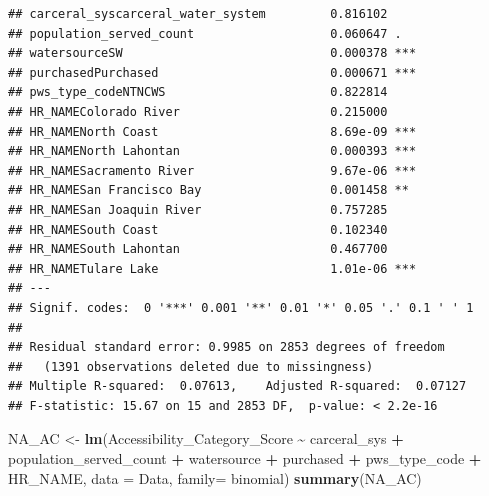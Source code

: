 \documentclass[
]{article}
\newenvironment{Shaded}{\begin{snugshade}}{\end{snugshade}}
\newcommand{\AttributeTok}[1]{\textcolor[rgb]{0.13,0.29,0.53}{#1}}
\newcommand{\FunctionTok}[1]{\textcolor[rgb]{0.13,0.29,0.53}{\textbf{#1}}}
\newcommand{\NormalTok}[1]{#1}
\newcommand{\OtherTok}[1]{\textcolor[rgb]{0.56,0.35,0.01}{#1}}
\newcommand{\SpecialCharTok}[1]{\textcolor[rgb]{0.81,0.36,0.00}{\textbf{#1}}}
\begin{document}
\begin{verbatim}
## carceral_syscarceral_water_system         0.816102    
## population_served_count                   0.060647 .  
## watersourceSW                             0.000378 ***
## purchasedPurchased                        0.000671 ***
## pws_type_codeNTNCWS                       0.822814    
## HR_NAMEColorado River                     0.215000    
## HR_NAMENorth Coast                        8.69e-09 ***
## HR_NAMENorth Lahontan                     0.000393 ***
## HR_NAMESacramento River                   9.67e-06 ***
## HR_NAMESan Francisco Bay                  0.001458 ** 
## HR_NAMESan Joaquin River                  0.757285    
## HR_NAMESouth Coast                        0.102340    
## HR_NAMESouth Lahontan                     0.467700    
## HR_NAMETulare Lake                        1.01e-06 ***
## ---
## Signif. codes:  0 '***' 0.001 '**' 0.01 '*' 0.05 '.' 0.1 ' ' 1
## 
## Residual standard error: 0.9985 on 2853 degrees of freedom
##   (1391 observations deleted due to missingness)
## Multiple R-squared:  0.07613,    Adjusted R-squared:  0.07127 
## F-statistic: 15.67 on 15 and 2853 DF,  p-value: < 2.2e-16
\end{verbatim}

\begin{Shaded}
\begin{Highlighting}[]
\NormalTok{NA\_AC }\OtherTok{\textless{}{-}} \FunctionTok{lm}\NormalTok{(Accessibility\_Category\_Score }\SpecialCharTok{\textasciitilde{}}\NormalTok{ carceral\_sys }\SpecialCharTok{+}\NormalTok{ population\_served\_count }\SpecialCharTok{+}\NormalTok{ watersource }\SpecialCharTok{+}\NormalTok{ purchased }\SpecialCharTok{+}\NormalTok{ pws\_type\_code }\SpecialCharTok{+}\NormalTok{ HR\_NAME, }\AttributeTok{data =}\NormalTok{ Data, }\AttributeTok{family=}\NormalTok{ binomial)}
\FunctionTok{summary}\NormalTok{(NA\_AC)}
\end{Highlighting}
\end{Shaded}
\end{document}
